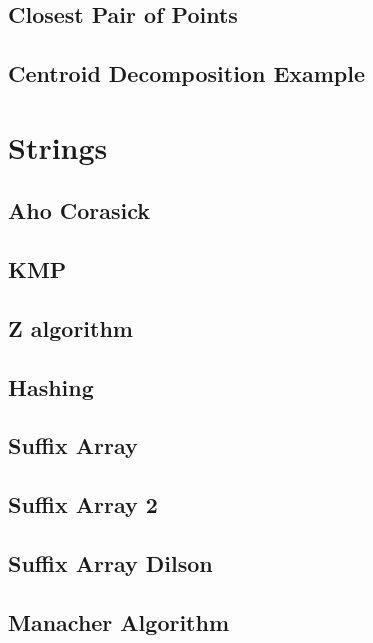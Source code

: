 \subsection{Closest Pair of Points}
\raggedbottom
\hrulefill
\subsection{Centroid Decomposition Example}
\raggedbottom
\hrulefill

\section{Strings}
\subsection{Aho Corasick}
\raggedbottom
\hrulefill
\subsection{KMP}
\raggedbottom
\hrulefill
\subsection{Z algorithm}
\raggedbottom
\hrulefill
\subsection{Hashing}
\raggedbottom
\hrulefill
\subsection{Suffix Array}
\raggedbottom
\hrulefill
\subsection{Suffix Array 2}
\raggedbottom
\hrulefill
\subsection{Suffix Array Dilson}
\raggedbottom
\hrulefill
\subsection{Manacher Algorithm}
\raggedbottom
\hrulefill
